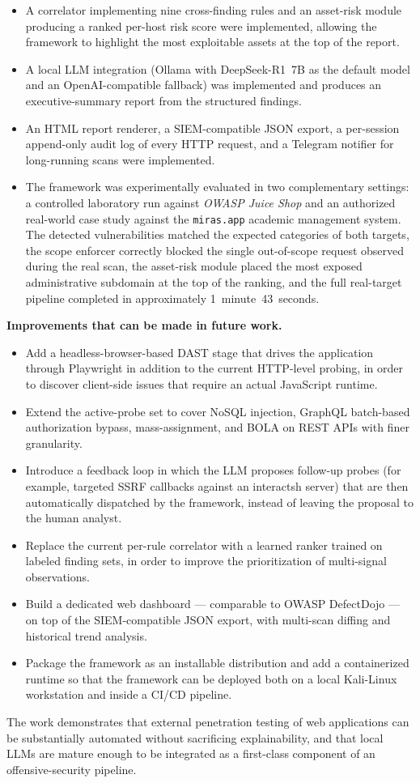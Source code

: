 \begin{itemize}
  \item A correlator implementing nine cross-finding rules and an asset-risk module producing a ranked per-host risk score were implemented, allowing the framework to highlight the most exploitable assets at the top of the report.
  \item A local LLM integration (Ollama with DeepSeek-R1~7B as the default model and an OpenAI-compatible fallback) was implemented and produces an executive-summary report from the structured findings.
  \item An HTML report renderer, a SIEM-compatible JSON export, a per-session append-only audit log of every HTTP request, and a Telegram notifier for long-running scans were implemented.
  \item The framework was experimentally evaluated in two complementary settings: a controlled laboratory run against \textit{OWASP Juice Shop} and an authorized real-world case study against the \texttt{miras.app} academic management system. The detected vulnerabilities matched the expected categories of both targets, the scope enforcer correctly blocked the single out-of-scope request observed during the real scan, the asset-risk module placed the most exposed administrative subdomain at the top of the ranking, and the full real-target pipeline completed in approximately 1~minute~43~seconds.
\end{itemize}

\textbf{Improvements that can be made in future work.}
\begin{itemize}
  \item Add a headless-browser-based DAST stage that drives the application through Playwright in addition to the current HTTP-level probing, in order to discover client-side issues that require an actual JavaScript runtime.
  \item Extend the active-probe set to cover NoSQL injection, GraphQL batch-based authorization bypass, mass-assignment, and BOLA on REST APIs with finer granularity.
  \item Introduce a feedback loop in which the LLM proposes follow-up probes (for example, targeted SSRF callbacks against an interactsh server) that are then automatically dispatched by the framework, instead of leaving the proposal to the human analyst.
  \item Replace the current per-rule correlator with a learned ranker trained on labeled finding sets, in order to improve the prioritization of multi-signal observations.
  \item Build a dedicated web dashboard --- comparable to OWASP DefectDojo --- on top of the SIEM-compatible JSON export, with multi-scan diffing and historical trend analysis.
  \item Package the framework as an installable distribution and add a containerized runtime so that the framework can be deployed both on a local Kali-Linux workstation and inside a CI/CD pipeline.
\end{itemize}

The work demonstrates that external penetration testing of web applications can be substantially automated without sacrificing explainability, and that local LLMs are mature enough to be integrated as a first-class component of an offensive-security pipeline.
